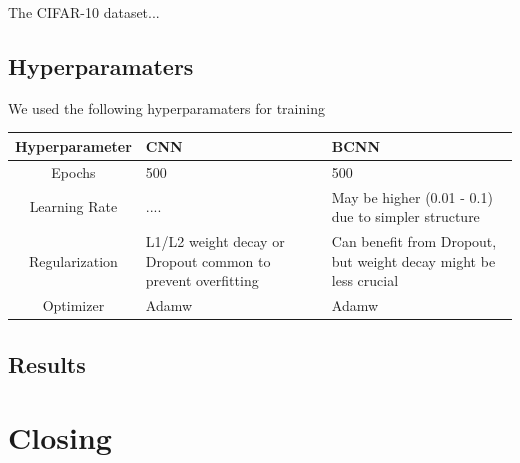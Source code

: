 \documentclass[12pt]{article}
\begin{document}
The CIFAR-10 dataset...


\subsection{Hyperparamaters}

We used the following hyperparamaters for training
	\begin{center}
		\begin{tabular}{|c||p{3cm}|p{3cm}|} %
			\hline
			\textbf{Hyperparameter} & \textbf{CNN} & \textbf{BCNN} \\ [0.5ex] 
			\hline\hline
			Epochs & 500 & 500\\
			\hline
			Learning Rate & ....  & May be higher (0.01 - 0.1) due to simpler structure  \\
			\hline
			Regularization & L1/L2 weight decay or Dropout common to prevent overfitting & Can benefit from Dropout, but weight decay might be less crucial \\
			\hline
			Optimizer & Adamw  & Adamw  \\
			\hline
		\end{tabular}
	\end{center}
	

\subsection{Results}

\section{Closing}





\newpage

\printbibliography
\end{document}
